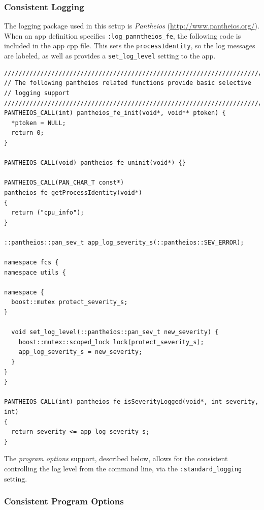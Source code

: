\documentclass[11pt]{article}
\begin{document}
\subsubsection{Consistent Logging}
\label{sec-6.2.1}


    The logging package used in this setup is \emph{Pantheios}
    (\href{http://www.pantheios.org/}{http://www.pantheios.org/}). When an app definition specifies
    \texttt{:log\_panntheios\_fe}, the following code is included in the app
    cpp file. This sets the \texttt{processIdentity}, so the log messages are
    labeled, as well as provides a \texttt{set\_log\_level} setting to the app.


\lstset{language=C++}
\begin{lstlisting}
////////////////////////////////////////////////////////////////////////////////
// The following pantheios related functions provide basic selective
// logging support
////////////////////////////////////////////////////////////////////////////////
PANTHEIOS_CALL(int) pantheios_fe_init(void*, void** ptoken) { 
  *ptoken = NULL; 
  return 0; 
}

PANTHEIOS_CALL(void) pantheios_fe_uninit(void*) {}

PANTHEIOS_CALL(PAN_CHAR_T const*) pantheios_fe_getProcessIdentity(void*)
{
  return ("cpu_info");
}

::pantheios::pan_sev_t app_log_severity_s(::pantheios::SEV_ERROR);

namespace fcs { 
namespace utils {

namespace {
  boost::mutex protect_severity_s;
}

  void set_log_level(::pantheios::pan_sev_t new_severity) {
    boost::mutex::scoped_lock lock(protect_severity_s);
    app_log_severity_s = new_severity;
  }
}
}

PANTHEIOS_CALL(int) pantheios_fe_isSeverityLogged(void*, int severity, int)
{
  return severity <= app_log_severity_s;
}
\end{lstlisting}



  The \emph{program options} support, described below, allows for the
  consistent controlling the log level from the command line, via the
  \texttt{:standard\_logging} setting.

\subsubsection{Consistent Program Options}
\label{sec-6.2.2}
\end{document}
